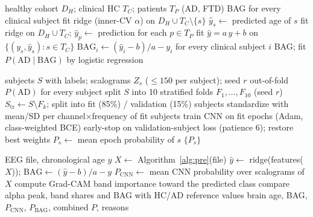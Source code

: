 \documentclass[journal]{IEEEtran}
\begin{document}
\begin{algorithm}[t]
\caption{Normative brain-age training, transfer and BAG}
\label{alg:ba}
\begin{algorithmic}[1]
\Require healthy cohort $D_H$; clinical HC $T_C$; patients $T_P$ (AD, FTD)
\Ensure BAG for every clinical subject
 
  \State fit ridge (inner-CV $\alpha$) on $D_H \cup T_C\setminus\{s\}$
  \State $\hat{y}_s \gets$ predicted age of $s$
\EndFor
\State fit ridge on $D_H \cup T_C$; $\hat{y}_p \gets$ prediction for each $p \in T_P$
\State fit $\hat{y} = a\,y + b$ on $\{(y_s,\hat{y}_s): s\in T_C\}$ 
\State $\mathrm{BAG}_i \gets (\hat{y}_i - b)/a - y_i$ for every clinical subject $i$
\State \Return BAG; fit $P(\mathrm{AD}\mid\mathrm{BAG})$ by logistic regression
\end{algorithmic}
\end{algorithm}

\begin{algorithm}[t]
\caption{Subject-level cross-validation of the CNN}
\label{alg:cnn}
\begin{algorithmic}[1]
\Require subjects $S$ with labels; scalograms $Z_s$ ($\le150$ per subject); seed $r$
\Ensure out-of-fold $P(\mathrm{AD})$ for every subject
\State split $S$ into 10 stratified folds $F_1,\dots,F_{10}$ (seed $r$)
  \State $S_\mathrm{tr} \gets S \setminus F_k$; split into fit (85\%) / validation (15\%) subjects
  \State standardize with mean/SD per channel$\times$frequency of fit subjects
  \State train CNN on fit epochs (Adam, class-weighted BCE)
  \State early-stop on validation-subject loss (patience 6); restore best weights
   \State $P_s \gets$ mean epoch probability of $s$ \EndFor
\EndFor
\State \Return $\{P_s\}$ 
\end{algorithmic}
\end{algorithm}

\begin{algorithm}[t]
\caption{Inference and report for a new subject}
\label{alg:inf}
\begin{algorithmic}[1]
\Require EEG file, chronological age $y$
\State $X \gets$ Algorithm~\ref{alg:pre}(file)
\State $\hat{y} \gets$ ridge(features($X$)); $\mathrm{BAG} \gets (\hat{y}-b)/a - y$
\State $P_\mathrm{CNN} \gets$ mean CNN probability over scalograms of $X$
\State compute Grad-CAM band importance toward the predicted class
\State compare alpha peak, band shares and BAG with HC/AD reference values
\State \Return brain age, BAG, $P_\mathrm{CNN}$, $P_\mathrm{BAG}$, combined $P$, reasons
\end{algorithmic}
\end{algorithm}
\end{document}
